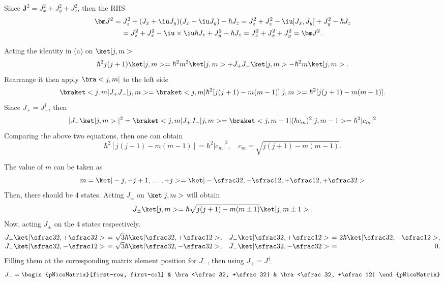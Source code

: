 \begin{solution}\leavevmode
  \begin{enumext}
    \item Since $\bm J^2 = J_x^2 + J_y^2 + J_z^2$, then the RHS
      \begin{multline*}
        \bm J^2 = J_z^2 + (J_x + \iu J_y)(J_x - \iu J_y) - \hbar J_z
      = J_z^2 + J_x^2 -\iu [J_x, J_y] + J_y^2 - \hbar J_z\\
      = J_z^2 + J_x^2 -\iu \times \iu \hbar J_z + J_y^2 - \hbar J_z
      = J_z^2 + J_x^2 + J_y^2 = \bm J^2.
      \end{multline*}
    \item Acting the identity in (a) on $\ket|j, m>$
    \[
      \hbar^2j(j + 1) \ket|j, m> = \hbar^2m^2 \ket|j, m>
        + J_+J_- \ket|j, m> - \hbar^2m\ket|j, m>.
    \]
    Rearrange it then apply $\bra<j, m|$ to the left side
    \[
      \braket<j, m|J_+J_-|j, m>
    = \braket<j, m|\hbar^2[j(j + 1) - m(m - 1)]|j, m>
    = \hbar^2[j(j + 1) - m(m - 1)].
    \]
    Since $J_+ = J_-^\dagger$, then
    \[
      |J_-\ket|j, m>|^2 = \braket<j, m|J_+J_-|j,m>
    = \braket<j, m - 1|(\hbar c_m)^2|j, m - 1> = \hbar^2 |c_m|^2
    \]
    Comparing the above two equations, then one can obtain
    \[
      \hbar^2[j(j + 1) - m(m - 1)] = \hbar^2 |c_m|^2,\quad
      c_m = \sqrt{j(j + 1) - m(m - 1)}.
    \]
    \item The value of $m$ can be taken as
    \[
      m = \ket|-j, -j + 1, \ldots, +j>
    = \ket|-\sfrac32, -\sfrac12, +\sfrac12, +\sfrac32>
    \]
    Then, there should be $4$ states. Acting $J_\pm$ on $\ket|j, m>$ will obtain
    \[
      J_\pm \ket|j, m> = \hbar \sqrt{j(j + 1) - m(m \pm 1)} \ket|j, m \pm 1>.
    \]
    Now, acting $J_\pm$ on the $4$ states respectively.
    \[\begin{array}{@{}l@{~}c@{~}r@{\quad}l@{~}c@{~}r@{}}
      J_- \ket|\sfrac32, +\sfrac32> &
    = & \sqrt3 \hbar \ket|\sfrac32, +\sfrac12>, &
      J_- \ket|\sfrac32, +\sfrac12> & = & 2 \hbar \ket|\sfrac32, -\sfrac12>,\\
      J_- \ket|\sfrac32, -\sfrac12> &
    = & \sqrt3 \hbar \ket|\sfrac32, -\sfrac32>, &
      J_- \ket|\sfrac32, -\sfrac32> & = & 0.\\
    \end{array}\]
    Filling them at the corresponding matrix element position for $J_-$, then
    using $J_+ = J_-^\dagger$
    \[
      J_- =
      \begin{pNiceMatrix}[first-row, first-col]
        & \bra<\sfrac32, +\sfrac32| & \bra<\sfrac32, +\sfrac12|

\end{pNiceMatrix}\]
\end{enumext}
\end{solution}
